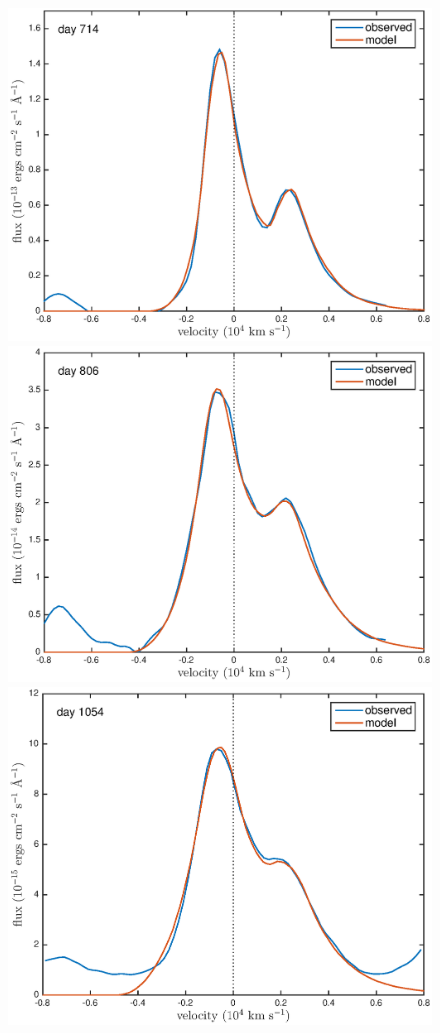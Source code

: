 \documentclass[useAMS,usenatbib,usegraphicx]{mnras}
\begin{document}
\begin{figure}
\begin{center}

\includegraphics[trim =33 10 45 15,clip=true,scale=0.41]{smooth/best_fit/d714OI_new}
\includegraphics[trim =33 10 45 15,clip=true,scale=0.41]{smooth/best_fit/d806OI_new}
\includegraphics[trim =33 10 45 15,clip=true,scale=0.41]{smooth/best_fit/d1054OI}

\end{center}
\end{figure}
\end{document}
